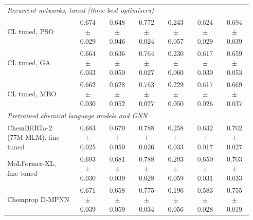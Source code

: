 \begin{tabular}{lcccccc}
\multicolumn{7}{l}{\emph{Recurrent networks, tuned (three best optimisers)}} \\
\quad CL tuned, PSO & 0.674 $\pm$ 0.029 & 0.648 $\pm$ 0.046 & 0.772 $\pm$ 0.024 & 0.243 $\pm$ 0.057 & 0.624 $\pm$ 0.029 & 0.694 $\pm$ 0.039 \\
\quad CL tuned, GA & 0.664 $\pm$ 0.033 & 0.636 $\pm$ 0.050 & 0.764 $\pm$ 0.027 & 0.230 $\pm$ 0.060 & 0.617 $\pm$ 0.030 & 0.659 $\pm$ 0.053 \\
\quad CL tuned, MBO & 0.662 $\pm$ 0.030 & 0.628 $\pm$ 0.052 & 0.763 $\pm$ 0.027 & 0.229 $\pm$ 0.050 & 0.617 $\pm$ 0.026 & 0.669 $\pm$ 0.037 \\
\multicolumn{7}{l}{\emph{Pretrained chemical language models and GNN}} \\
\quad ChemBERTa-2 (77M-MLM), fine-tuned & 0.683 $\pm$ 0.025 & 0.670 $\pm$ 0.050 & 0.788 $\pm$ 0.026 & 0.258 $\pm$ 0.033 & 0.632 $\pm$ 0.017 & 0.702 $\pm$ 0.027 \\
\quad MoLFormer-XL, fine-tuned & 0.693 $\pm$ 0.030 & 0.681 $\pm$ 0.039 & 0.788 $\pm$ 0.028 & 0.293 $\pm$ 0.059 & 0.650 $\pm$ 0.031 & 0.703 $\pm$ 0.033 \\
\quad Chemprop D-MPNN & 0.671 $\pm$ 0.039 & 0.658 $\pm$ 0.059 & 0.775 $\pm$ 0.034 & 0.196 $\pm$ 0.056 & 0.583 $\pm$ 0.028 & 0.755 $\pm$ 0.019 \\
\bottomrule
\end{tabular}